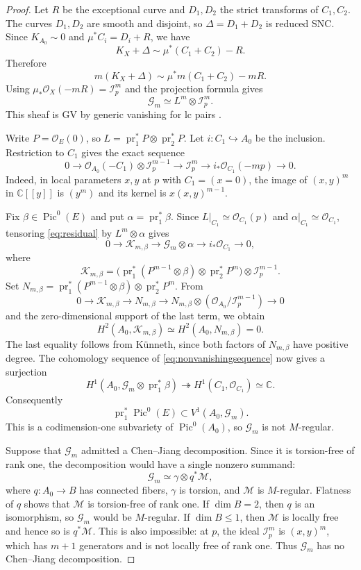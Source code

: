 \documentclass[11pt,letterpaper]{article}
\theoremstyle{paper}
\newcommand{\OO}{\mathcal O}
\newcommand{\GG}{\mathcal G}
\newcommand{\II}{\mathcal I}
\newcommand{\CC}{\mathbb C}
\DeclareMathOperator{\Pic}{Pic}
\DeclareMathOperator{\pr}{pr}
\begin{document}
\begin{proof}
Let $R$ be the exceptional curve and $D_1,D_2$ the strict transforms of $C_1,C_2$. The curves $D_1,D_2$ are smooth and disjoint, so $\Delta=D_1+D_2$ is reduced SNC. Since $K_{A_0}\sim0$ and $\mu^*C_i=D_i+R$, we have
\[
K_X+\Delta\sim\mu^*(C_1+C_2)-R.
\]
Therefore
\[
m(K_X+\Delta)\sim\mu^*m(C_1+C_2)-mR.
\]
Using $\mu_*\OO_X(-mR)=\II_p^m$ and the projection formula gives
\[
\GG_m\simeq L^m\otimes\II_p^m.
\]
This sheaf is GV by generic vanishing for lc pairs \cite[Variant 5.5]{PS}.

Write $P=\OO_E(0)$, so $L=\pr_1^*P\otimes\pr_2^*P$. Let $i:C_1\hookrightarrow A_0$ be the inclusion. Restriction to $C_1$ gives the exact sequence
\begin{equation}\label{eq:residual}
0\longrightarrow\OO_{A_0}(-C_1)\otimes\II_p^{m-1}
\longrightarrow\II_p^m\longrightarrow i_*\OO_{C_1}(-mp)\longrightarrow0.
\end{equation}
Indeed, in local parameters $x,y$ at $p$ with $C_1=(x=0)$, the image of $(x,y)^m$ in $\CC[[y]]$ is $(y^m)$ and its kernel is $x(x,y)^{m-1}$.

Fix $\beta\in\Pic^0(E)$ and put $\alpha=\pr_1^*\beta$. Since $L|_{C_1}\simeq\OO_{C_1}(p)$ and $\alpha|_{C_1}\simeq\OO_{C_1}$, tensoring \eqref{eq:residual} by $L^m\otimes\alpha$ gives
\begin{equation}\label{eq:nonvanishingsequence}
0\longrightarrow\mathcal K_{m,\beta}\longrightarrow\GG_m\otimes\alpha
\longrightarrow i_*\OO_{C_1}\longrightarrow0,
\end{equation}
where
\[
\mathcal K_{m,\beta}=
\bigl(\pr_1^*(P^{m-1}\otimes\beta)\otimes\pr_2^*P^m\bigr)\otimes\II_p^{m-1}.
\]
Set $N_{m,\beta}=\pr_1^*(P^{m-1}\otimes\beta)\otimes\pr_2^*P^m$. From
\[
0\longrightarrow\mathcal K_{m,\beta}\longrightarrow N_{m,\beta}
\longrightarrow N_{m,\beta}\otimes(\OO_{A_0}/\II_p^{m-1})\longrightarrow0
\]
and the zero-dimensional support of the last term, we obtain
\[
H^2(A_0,\mathcal K_{m,\beta})\simeq H^2(A_0,N_{m,\beta})=0.
\]
The last equality follows from K\"unneth, since both factors of $N_{m,\beta}$ have positive degree. The cohomology sequence of \eqref{eq:nonvanishingsequence} now gives a surjection
\[
H^1(A_0,\GG_m\otimes\pr_1^*\beta)\twoheadrightarrow
H^1(C_1,\OO_{C_1})\simeq\CC.
\]
Consequently
\[
\pr_1^*\Pic^0(E)\subset V^1(A_0,\GG_m).
\]
This is a codimension-one subvariety of $\Pic^0(A_0)$, so $\GG_m$ is not $M$-regular.

Suppose that $\GG_m$ admitted a Chen--Jiang decomposition. Since it is torsion-free of rank one, the decomposition would have a single nonzero summand:
\[
\GG_m\simeq\gamma\otimes q^*\mathcal M,
\]
where $q:A_0\to B$ has connected fibers, $\gamma$ is torsion, and $\mathcal M$ is $M$-regular. Flatness of $q$ shows that $\mathcal M$ is torsion-free of rank one. If $\dim B=2$, then $q$ is an isomorphism, so $\GG_m$ would be $M$-regular. If $\dim B\le1$, then $\mathcal M$ is locally free and hence so is $q^*\mathcal M$. This is also impossible: at $p$, the ideal $\II_p^m$ is $(x,y)^m$, which has $m+1$ generators and is not locally free of rank one. Thus $\GG_m$ has no Chen--Jiang decomposition.
\end{proof}
\end{document}
